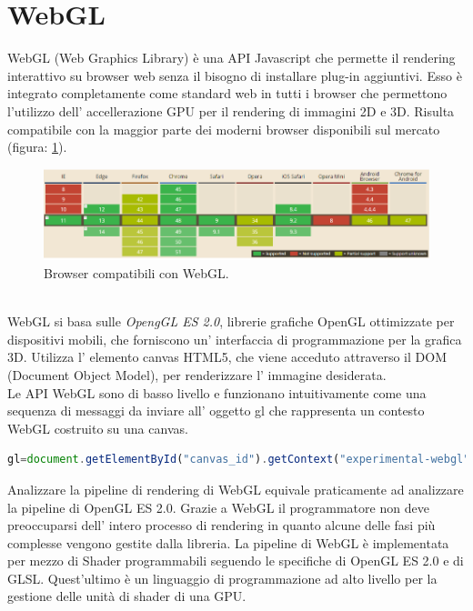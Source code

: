 \section{WebGL}
\label{sec:chapter_tecnologie_abilitanti_webgl}
WebGL (Web Graphics Library) è una API Javascript che permette il rendering interattivo su browser web senza il bisogno di installare plug-in aggiuntivi. \cite{webgl1,webgl2}
Esso è integrato completamente come standard web in tutti i browser che permettono l’utilizzo dell’ accellerazione GPU per il rendering di immagini 2D e 3D.
Risulta compatibile con la maggior parte dei moderni browser disponibili sul mercato (figura: \ref{fig:stato_arte_webgl_compat}).
\\
\begin{figure}[htb]
 \centering
 \includegraphics[width=1\linewidth]{images/chapter_tecnologie_abilitanti/tecnologie_abilitanti_webgl_compat.png}\hfill
 \caption[Lista browser compatibili]{Browser compatibili con WebGL.}
 \label{fig:stato_arte_webgl_compat}
\end{figure}
\\
WebGL si basa sulle \emph{OpengGL ES 2.0}, librerie grafiche OpenGL ottimizzate per dispositivi mobili, che forniscono un’ interfaccia di programmazione per la grafica 3D. Utilizza l’ elemento canvas HTML5, che viene acceduto attraverso il DOM (Document Object Model), per renderizzare l’ immagine desiderata. \cite{webgl3}
\\
Le API WebGL sono di basso livello e funzionano intuitivamente come una sequenza di messaggi da inviare all’ oggetto gl che rappresenta un contesto WebGL costruito su una canvas.
\begin{lstlisting}[language=JavaScript]
gl=document.getElementById("canvas_id").getContext("experimental-webgl");
\end{lstlisting}
Analizzare la pipeline di rendering di WebGL equivale praticamente ad analizzare la pipeline di OpenGL ES 2.0. Grazie a WebGL il programmatore non deve preoccuparsi dell’ intero processo di rendering in quanto alcune delle fasi più complesse vengono gestite dalla libreria.
La pipeline di WebGL è implementata per mezzo di Shader programmabili seguendo le specifiche di OpenGL ES 2.0 e di GLSL. Quest’ultimo è un linguaggio di programmazione ad alto livello per la gestione delle unità di shader di una GPU. \cite{webgl5,webgl6}
